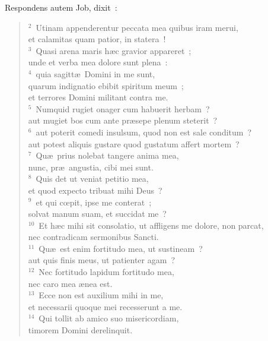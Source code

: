 \lettrine[lines=10,image=true,loversize=0.05,lraise=-0.03]{R}{}espondens autem Job, dixit~:
\begin{flushleft}\begin{verse}\vspace{6pt}${}^{2}$~Utinam appenderentur peccata mea quibus iram merui,\\ et calamitas quam patior, in statera~!\\
${}^{3}$~Quasi arena maris h\ae c gravior appareret~;\\ unde et verba mea dolore sunt plena~:\\
${}^{4}$~quia sagitt\ae\ Domini in me sunt,\\ quarum indignatio ebibit spiritum meum~;\\ et terrores Domini militant contra me.\\
${}^{5}$~Numquid rugiet onager cum habuerit herbam~?\\ aut mugiet bos cum ante pr\ae sepe plenum steterit~?\\
${}^{6}$~aut poterit comedi insulsum, quod non est sale conditum~?\\ aut potest aliquis gustare quod gustatum affert mortem~?\\
${}^{7}$~Qu\ae\ prius nolebat tangere anima mea,\\ nunc, pr\ae\ angustia, cibi mei sunt.\\
${}^{8}$~Quis det ut veniat petitio mea,\\ et quod expecto tribuat mihi Deus~?\\
${}^{9}$~et qui cœpit, ipse me conterat~;\\ solvat manum suam, et succidat me~?\\
${}^{10}$~Et h\ae c mihi sit consolatio, ut affligens me dolore, non parcat,\\ nec contradicam sermonibus Sancti.\\
${}^{11}$~Qu\ae\ est enim fortitudo mea, ut sustineam~?\\ aut quis finis meus, ut patienter agam~?\\
${}^{12}$~Nec fortitudo lapidum fortitudo mea,\\ nec caro mea \ae nea est.\\
${}^{13}$~Ecce non est auxilium mihi in me,\\ et necessarii quoque mei recesserunt a me.\\
${}^{14}$~Qui tollit ab amico suo misericordiam,\\ timorem Domini derelinquit.\\

\end{verse}
\end{flushleft}

